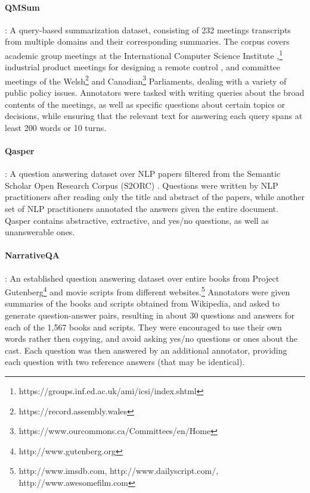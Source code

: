 \paragraph{QMSum} \cite{zhong-etal-2021-qmsum}: A query-based summarization dataset, consisting of 232 meetings transcripts from multiple domains and their corresponding summaries. The corpus covers academic group meetings at the International Computer Science Institute \cite{1198793},\footnote{https://groups.inf.ed.ac.uk/ami/icsi/index.shtml} industrial product meetings for designing a remote control \cite{10.1007/11677482_3}, and committee meetings of the Welsh\footnote{https://record.assembly.wales} and Canadian\footnote{https://www.ourcommons.ca/Committees/en/Home} Parliaments, dealing with a variety of public policy issues. Annotators were tasked with writing queries about the broad contents of the meetings, as well as specific questions about certain topics or decisions, while ensuring that the relevant text for answering each query spans at least 200 words or 10 turns.

\paragraph{Qasper} \cite{dasigi-etal-2021-dataset}: A question answering dataset over NLP papers filtered from the Semantic Scholar Open Research Corpus (S2ORC) \cite{lo-etal-2020-s2orc}. Questions were written by NLP practitioners after reading only the title and abstract of the papers, while another set of NLP practitioners annotated the answers given the entire document. Qasper contains abstractive, extractive, and yes/no questions, as well as unanswerable ones. 

\paragraph{NarrativeQA} \cite{kocisky-etal-2018-narrativeqa}: An established question answering dataset over entire books from Project Gutenberg\footnote{\label{gutenberg}http://www.gutenberg.org} and movie scripts from different websites.\footnote{http://www.imsdb.com, http://www.dailyscript.com/, http://www.awesomefilm.com} Annotators were given summaries of the books and scripts obtained from Wikipedia, and asked to generate question-answer pairs, resulting in about 30 questions and answers for each of the 1,567 books and scripts. They were encouraged to use their own words rather then copying, and avoid asking yes/no questions or ones about the cast. Each question was then answered by an additional annotator, providing each question with two reference answers (that may be identical).

